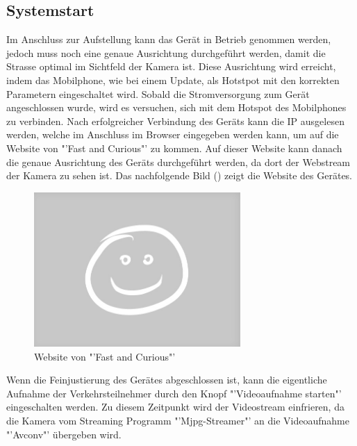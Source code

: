\subsection{Systemstart}
Im Anschluss zur Aufstellung kann das Gerät in Betrieb genommen werden, jedoch muss noch eine genaue Ausrichtung durchgeführt werden, damit die Strasse optimal im Sichtfeld der Kamera ist. Diese Ausrichtung wird erreicht, indem das Mobilphone, wie bei einem Update, als Hotstpot mit den korrekten Parametern eingeschaltet wird. Sobald die Stromversorgung zum Gerät angeschlossen wurde, wird es versuchen, sich mit dem Hotspot des Mobilphones zu verbinden. Nach erfolgreicher Verbindung des Geräts kann die IP ausgelesen werden, welche im Anschluss im Browser eingegeben werden kann, um auf die Website von "'Fast and Curious"' zu kommen. Auf dieser Website kann danach die genaue Ausrichtung des Geräts durchgeführt werden, da dort der Webstream der Kamera zu sehen ist. Das nachfolgende Bild () zeigt die Website des Gerätes.

\begin{figure}[H]
  \centering
  \includegraphics[width=0.7\textwidth]{Bedienungsanleitung/Website.jpg} 
  \caption{Website von "'Fast and Curious"'}
  \label{bWebsite}
\end{figure} 

Wenn die Feinjustierung des Gerätes abgeschlossen ist, kann die eigentliche Aufnahme der Verkehrsteilnehmer durch den Knopf "'Videoaufnahme starten"' eingeschalten werden. Zu diesem Zeitpunkt wird der Videostream einfrieren, da die Kamera vom Streaming Programm "'Mjpg-Streamer"' an die Videoaufnahme "'Avconv"' übergeben wird.